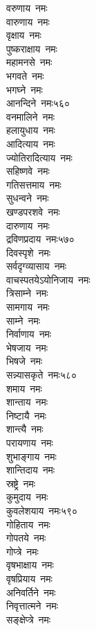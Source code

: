 \begin{multicols}{\maxColumns}
\begin{flushleft}
वरुणाय~नमः\\
वारुणाय~नमः\\
वृक्षाय~नमः\\
पुष्कराक्षाय~नमः\\
महामनसे~नमः\\
भगवते~नमः\\
भगघ्ने~नमः\\
आनन्दिने~नमः\hfill ५६०\\
वनमालिने~नमः\\
हलायुधाय~नमः\\
आदित्याय~नमः\\
ज्योतिरादित्याय~नमः\\
सहिष्णवे~नमः\\
गतिसत्तमाय~नमः\\
सुधन्वने~नमः\\
खण्डपरशवे~नमः\\
दारुणाय~नमः\\
द्रविणप्रदाय~नमः\hfill ५७०\\
दिवस्पृशे~नमः\\
सर्वदृग्व्यासाय~नमः\\
वाचस्पतयेऽयोनिजाय~नमः\\
त्रिसाम्ने~नमः\\
सामगाय~नमः\\
साम्ने~नमः\\
निर्वाणाय~नमः\\
भेषजाय~नमः\\
भिषजे~नमः\\
सन्न्यासकृते~नमः\hfill ५८०\\
शमाय~नमः\\
शान्ताय~नमः\\
निष्टायै~नमः\\
शान्त्यै~नमः\\
परायणाय~नमः\\
शुभाङ्गाय~नमः\\
शान्तिदाय~नमः\\
स्रष्ट्रे~नमः\\
कुमुदाय~नमः\\
कुवलेशयाय~नमः\hfill ५९०\\
गोहिताय~नमः\\
गोपतये~नमः\\
गोप्त्रे~नमः\\
वृषभाक्षाय~नमः\\
वृषप्रियाय~नमः\\
अनिवर्तिने~नमः\\
निवृत्तात्मने~नमः\\
सङ्क्षेप्त्रे~नमः\\

\end{flushleft}
\end{multicols}
